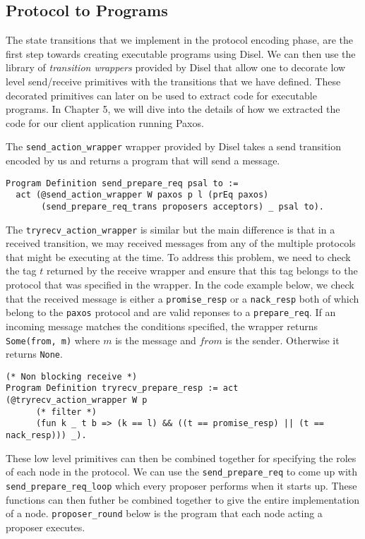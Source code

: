 \subsection{Protocol to Programs}
The state transitions that we implement in the protocol encoding phase, are the
first step towards creating executable programs using Disel.
We can then use the library of \textit{transition wrappers} provided by Disel
that allow one to decorate low level send/receive primitives with the transitions
that we have defined. These decorated primitives can later on be used to extract
code for executable programs. In Chapter 5, we will dive into the details of
how we extracted the code for our client application running Paxos.

The \texttt{send\_action\_wrapper} wrapper provided by Disel takes a send transition encoded
by us and returns a program that will send a message.
\begin{lstlisting}
Program Definition send_prepare_req psal to :=
  act (@send_action_wrapper W paxos p l (prEq paxos)
       (send_prepare_req_trans proposers acceptors) _ psal to).
\end{lstlisting}

The \texttt{tryrecv\_action\_wrapper} is similar but the main difference is that in
a received transition, we may received messages from any of the multiple protocols
that might be executing at the time. To address this problem, we need to check the
tag $t$ returned by the receive wrapper and ensure that this tag belongs to the
protocol that was specified in the wrapper. In the code example below, we check
that the received message is either a \texttt{promise\_resp} or a \texttt{nack\_resp}
both of which belong to the \texttt{paxos} protocol and are valid reponses to a
\texttt{prepare\_req}.
If an incoming message matches the conditions specified, the wrapper returns
\texttt{Some(from, m)} where $m$ is the message and $from$ is the sender. Otherwise
it returns \texttt{None}.

\begin{lstlisting}
(* Non blocking receive *)
Program Definition tryrecv_prepare_resp := act (@tryrecv_action_wrapper W p
      (* filter *)
      (fun k _ t b => (k == l) && ((t == promise_resp) || (t == nack_resp))) _).
\end{lstlisting}

These low level primitives can then be combined together for specifying the roles
of each node in the protocol. We can use the \texttt{send\_prepare\_req} to
come up with \texttt{send\_prepare\_req\_loop} which every proposer performs when
it starts up. These functions can then futher be combined together to give the
entire implementation of a node. \texttt{proposer\_round} below is the program
that each node acting a proposer executes.

